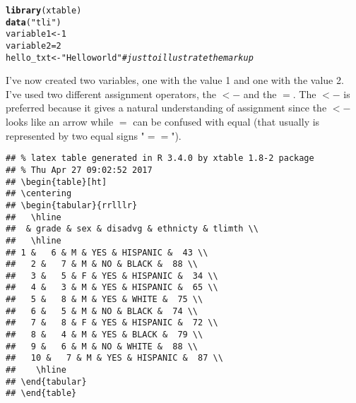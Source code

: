 \documentclass{article}\usepackage[]{graphicx}\usepackage[]{color}
\makeatletter
\newcommand{\hlnum}[1]{\textcolor[rgb]{0.686,0.059,0.569}{#1}}%
\newcommand{\hlstr}[1]{\textcolor[rgb]{0.192,0.494,0.8}{#1}}%
\newcommand{\hlcom}[1]{\textcolor[rgb]{0.678,0.584,0.686}{\textit{#1}}}%
\newcommand{\hlstd}[1]{\textcolor[rgb]{0.345,0.345,0.345}{#1}}%
\newcommand{\hlkwb}[1]{\textcolor[rgb]{0.69,0.353,0.396}{#1}}%
\newcommand{\hlkwd}[1]{\textcolor[rgb]{0.737,0.353,0.396}{\textbf{#1}}}%
\newenvironment{kframe}{%
 \def\at@end@of@kframe{}%
 \ifinner\ifhmode%
  \def\at@end@of@kframe{\end{minipage}}%
  \begin{minipage}{\columnwidth}%
 \fi\fi%
 \def\FrameCommand##1{\hskip\@totalleftmargin \hskip-\fboxsep
 \colorbox{shadecolor}{##1}\hskip-\fboxsep
     \hskip-\linewidth \hskip-\@totalleftmargin \hskip\columnwidth}%
 \MakeFramed {\advance\hsize-\width
   \@totalleftmargin\z@ \linewidth\hsize
   \@setminipage}}%
 {\par\unskip\endMakeFramed%
 \at@end@of@kframe}
\newenvironment{knitrout}{}{} %
\makeatother
\begin{document}
\begin{knitrout}
\color{fgcolor}\begin{kframe}
\begin{alltt}
\hlkwd{library}\hlstd{(xtable)}
\hlkwd{data}\hlstd{(}\hlstr{"tli"}\hlstd{)}
\hlstd{variable1} \hlkwb{<-} \hlnum{1}
\hlstd{variable2} \hlkwb{=} \hlnum{2}
\hlstd{hello_txt} \hlkwb{<-} \hlstr{"Hello world"} \hlcom{# just to illustrate the markup}
\end{alltt}
\end{kframe}
\end{knitrout}

I've now created two variables, one with the value 1
and one with the value 2. I've used two different 
assignment operators, the $<-$ and the $=$. The $<-$ is preferred because 
it gives a natural understanding of assignment since the $<-$ looks 
like an arrow while $=$ can be confused with equal (that usually 
is represented by two equal signs "$==$").

\begin{knitrout}
\color{fgcolor}\begin{kframe}
\begin{verbatim}
## % latex table generated in R 3.4.0 by xtable 1.8-2 package
## % Thu Apr 27 09:02:52 2017
## \begin{table}[ht]
## \centering
## \begin{tabular}{rrlllr}
##   \hline
##  & grade & sex & disadvg & ethnicty & tlimth \\ 
##   \hline
## 1 &   6 & M & YES & HISPANIC &  43 \\ 
##   2 &   7 & M & NO & BLACK &  88 \\ 
##   3 &   5 & F & YES & HISPANIC &  34 \\ 
##   4 &   3 & M & YES & HISPANIC &  65 \\ 
##   5 &   8 & M & YES & WHITE &  75 \\ 
##   6 &   5 & M & NO & BLACK &  74 \\ 
##   7 &   8 & F & YES & HISPANIC &  72 \\ 
##   8 &   4 & M & YES & BLACK &  79 \\ 
##   9 &   6 & M & NO & WHITE &  88 \\ 
##   10 &   7 & M & YES & HISPANIC &  87 \\ 
##    \hline
## \end{tabular}
## \end{table}
\end{verbatim}
\end{kframe}
\end{knitrout}
\end{document}
